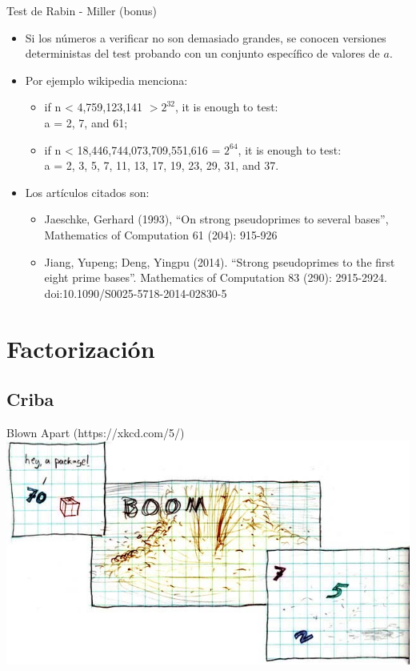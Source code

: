 \documentclass{beamer}
\begin{document}
\begin{frame}{Test de Rabin - Miller (bonus)}
    \begin{itemize}
      \item Si los números a verificar no son demasiado grandes, se conocen versiones deterministas del test probando con un conjunto específico de valores de $a$.
      \item Por ejemplo wikipedia menciona:
        \begin{itemize}
          \item if n < 4,759,123,141 $>2^{32}$, it is enough to test: \\ a = 2, 7, and 61;
          \item if n < 18,446,744,073,709,551,616 = $2^{64}$, it is enough to test: \\a = 2, 3, 5, 7, 11, 13, 17, 19, 23, 29, 31, and 37.
        \end{itemize}
      \item Los artículos citados son:
        \begin{itemize}
          \item Jaeschke, Gerhard (1993), ``On strong pseudoprimes to several bases'', Mathematics of Computation 61 (204): 915-926
          \item Jiang, Yupeng; Deng, Yingpu (2014). ``Strong pseudoprimes to the first eight prime bases''. Mathematics of Computation 83 (290): 2915-2924. doi:10.1090/S0025-5718-2014-02830-5
        \end{itemize}
  \end{itemize}
\end{frame}





\section{Factorización}

\subsection{Criba}

\begin{frame}{Blown Apart (https://xkcd.com/5/)}
  \includegraphics{blownApart.jpg}
\end{frame}
\end{document}
